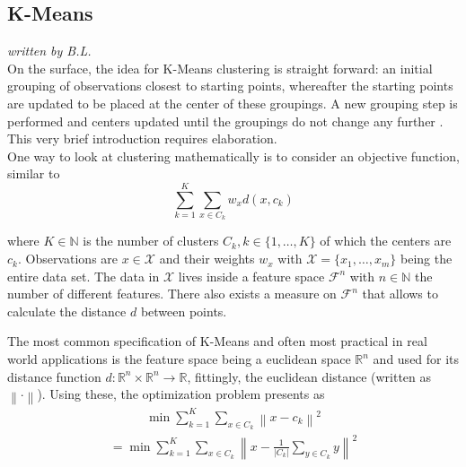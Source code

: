 \subsection{K-Means}
\textit{written by B.L.}\\

\label{subsec:method_kmeans}
On the surface, the idea for K-Means clustering is straight forward: an initial grouping of observations closest to starting points, whereafter the starting points are updated to be placed at the center of these groupings. A new grouping step is performed and centers updated until the groupings do not change any further \cite{wiedenbeck2001klassifikation, fahrmeir2015multivariate}. This very brief introduction requires elaboration.\\

One way to look at clustering mathematically is to consider an objective function, similar to \cite{wu2012advances}
\begin{equation}
    \sum_{k=1}^{K}\sum_{x \in C_{k}}^{} w_{x}d(x, c_{k})
\end{equation}

where $K \in \mathbb{N}$ is the number of clusters $C_{k}, k \in \{ 1,\dots,K \}$ of which the centers are $c_{k}$. Observations are $x \in \mathcal{X}$ and their weights $w_{x}$ with $\mathcal{X} = \{ x_{1}, \dots, x_{m} \}$ being the entire data set. The data in $\mathcal{X}$ lives inside a feature space $\mathcal{F}^{n}$ with $n \in \mathbb{N}$ the number of different features. There also exists a measure on $\mathcal{F}^{n}$ that allows to calculate the distance $d$ between points. 

The most common specification of K-Means and often most practical in real world applications is the feature space being a euclidean space $\mathbb{R}^{n}$ and used for its distance function $d: \mathbb{R}^{n} \times \mathbb{R}^{n} \rightarrow \mathbb{R}$, fittingly, the euclidean distance (written as $\left \| \cdot \right \|$). Using these, the optimization problem presents as
\begin{equation}
\begin{gathered}
    \min \sum_{k=1}^{K}\sum_{x \in C_{k}}^{} \left \| x - c_{k} \right \|^2
\end{gathered}\label{eqn:kmeans_basic}
\end{equation}
\begin{equation}
\begin{gathered}
    = \min \sum_{k=1}^{K}\sum_{x \in C_{k}}^{} \left \| x - \frac{1}{\left | C_{k} \right |} \sum_{y \in C_{k}}^{} y  \right \|^2
\end{gathered}\label{eq:kmeans_basic_other}
\end{equation}

